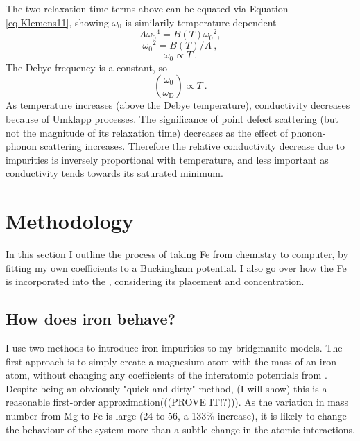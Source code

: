 The two relaxation time terms above can be equated via Equation \ref{eq.Klemens11}, showing $\omega_{0}$ is similarily temperature-dependent
%
$$A{\omega_{0}}^{4}=B\left(T\right){\omega_{0}}^{2},$$
$${\omega_{0}}^{2}=B\left(T\right)/A\ ,$$
%
\begin{equation}
\omega_{0} \propto T\ .
\label{eq.Klemens23mod}
\end{equation}
%
The Debye frequency is a constant, so
%
\begin{equation}
\left (\frac{\omega_{\mathrm{0}}}{\omega_{\mathrm{D}}} \right ) \propto T\ .
\label{eq.Klemens23mod2}
\end{equation}
%
As temperature increases (above the Debye temperature), conductivity decreases because of Umklapp processes. The significance of point defect scattering (but not the magnitude of its relaxation time) decreases as the effect of phonon-phonon scattering increases. Therefore the relative conductivity decrease due to impurities is inversely proportional with temperature, and less important as conductivity tends towards its saturated minimum.




\section{Methodology}

In this section I outline the process of taking Fe from chemistry to computer, by fitting my own coefficients to a Buckingham potential. I also go over how the Fe is incorporated into the \mgsio, considering its placement and concentration.

\subsection{How does iron behave?} 

I use two methods to introduce iron impurities to my bridgmanite models. The first approach is to simply create a magnesium atom with the mass of an iron atom, without changing any coefficients of the interatomic potentials from \citet{Oganov2000}. Despite being an obviously "quick and dirty" method, (I will show) this is a reasonable first-order approximation(((PROVE IT!?))). As the variation in mass number from Mg to Fe is large (24 to 56, a 133\% increase), it is likely to change the behaviour of the system more than a subtle change in the atomic interactions.

